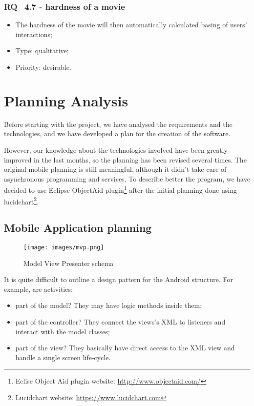 \subsubsection{RQ\_4.7 - hardness of a movie}
	\begin{itemize}
		\item The hardness of the movie will then automatically calculated basing of users' interactions;
		\item Type: qualitative;
		\item Priority: desirable.
	\end{itemize}

\newpage
\thispagestyle{empty}
\mbox{}
\newpage

\section{Planning Analysis}
\label{sec:planning}

Before starting with the project, we have analysed the requirements and the technologies, and we have developed a plan for the creation of the software.

However, our knowledge about the technologies involved have been greatly improved in the last months, so the planning has been revised several times. The original mobile planning is still meaningful, although it didn't take care of asynchronous programming and services. To describe better the program, we have decided to use Eclipse ObjectAid plugin\footnote{Eclise Object Aid plugin website: \url{http://www.objectaid.com/}} after the initial planning done using lucidchart\footnote{Lucidchart website: \url{https://www.lucidchart.com}}.

\subsection{Mobile Application planning}

\begin{figure}[H]
\centering %
\texttt{[image: images/mvp.png]}
\caption{Model View Presenter schema}
\label{fig:mvp}
\end{figure}

It is quite difficult to outline a design pattern for the Android structure. For example, are activities:
\begin{itemize}
\item part of the model? They may have logic methods inside them;
\item part of the controller? They connect the views's XML to listeners and interact with the model classes;
\item part of the view? They basically have direct access to the XML view and handle a single screen life-cycle.
\end{itemize}

